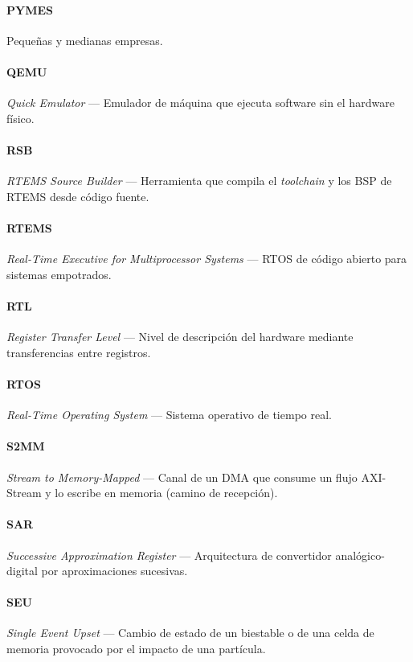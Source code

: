 \paragraph{PYMES} Pequeñas y medianas empresas.

\paragraph{QEMU} \textit{Quick Emulator} --- Emulador de máquina que ejecuta software sin el hardware físico.

\paragraph{RSB} \textit{RTEMS Source Builder} --- Herramienta que compila el \textit{toolchain} y los BSP de RTEMS desde código fuente.

\paragraph{RTEMS} \textit{Real-Time Executive for Multiprocessor Systems} --- RTOS de código abierto para sistemas empotrados.

\paragraph{RTL} \textit{Register Transfer Level} --- Nivel de descripción del hardware mediante transferencias entre registros.

\paragraph{RTOS} \textit{Real-Time Operating System} --- Sistema operativo de tiempo real.

\paragraph{S2MM} \textit{Stream to Memory-Mapped} --- Canal de un DMA que consume un flujo AXI-Stream y lo escribe en memoria (camino de recepción).

\paragraph{SAR} \textit{Successive Approximation Register} --- Arquitectura de convertidor analógico-digital por aproximaciones sucesivas.

\paragraph{SEU} \textit{Single Event Upset} --- Cambio de estado de un biestable o de una celda de memoria provocado por el impacto de una partícula.

